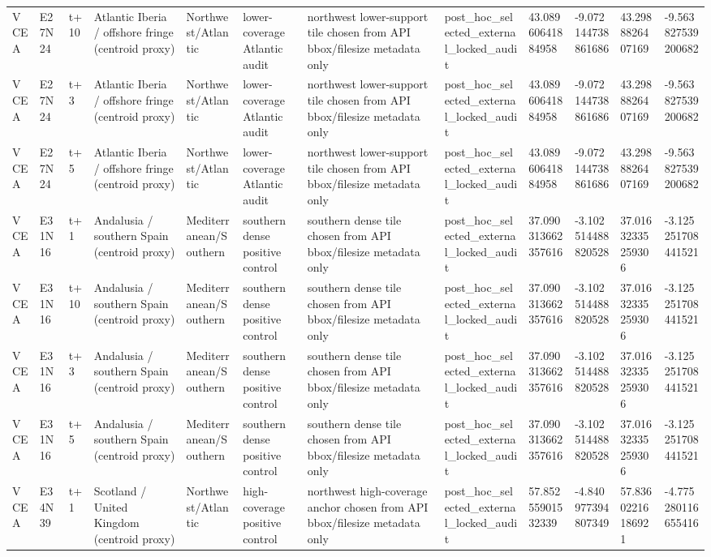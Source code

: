\begin{landscape}
\begin{longtable}{llllllllllll}
VCEA & E27N24 & t+10 & Atlantic Iberia / offshore fringe (centroid proxy) & Northwest/Atlantic & lower-coverage Atlantic audit & northwest lower-support tile chosen from API bbox/filesize metadata only & post\_hoc\_selected\_external\_locked\_audit & 43.08960641884958 & -9.072144738861686 & 43.2988826407169 & -9.563827539200682 \\
VCEA & E27N24 & t+3 & Atlantic Iberia / offshore fringe (centroid proxy) & Northwest/Atlantic & lower-coverage Atlantic audit & northwest lower-support tile chosen from API bbox/filesize metadata only & post\_hoc\_selected\_external\_locked\_audit & 43.08960641884958 & -9.072144738861686 & 43.2988826407169 & -9.563827539200682 \\
VCEA & E27N24 & t+5 & Atlantic Iberia / offshore fringe (centroid proxy) & Northwest/Atlantic & lower-coverage Atlantic audit & northwest lower-support tile chosen from API bbox/filesize metadata only & post\_hoc\_selected\_external\_locked\_audit & 43.08960641884958 & -9.072144738861686 & 43.2988826407169 & -9.563827539200682 \\
VCEA & E31N16 & t+1 & Andalusia / southern Spain (centroid proxy) & Mediterranean/Southern & southern dense positive control & southern dense tile chosen from API bbox/filesize metadata only & post\_hoc\_selected\_external\_locked\_audit & 37.090313662357616 & -3.102514488820528 & 37.01632335259306 & -3.125251708441521 \\
VCEA & E31N16 & t+10 & Andalusia / southern Spain (centroid proxy) & Mediterranean/Southern & southern dense positive control & southern dense tile chosen from API bbox/filesize metadata only & post\_hoc\_selected\_external\_locked\_audit & 37.090313662357616 & -3.102514488820528 & 37.01632335259306 & -3.125251708441521 \\
VCEA & E31N16 & t+3 & Andalusia / southern Spain (centroid proxy) & Mediterranean/Southern & southern dense positive control & southern dense tile chosen from API bbox/filesize metadata only & post\_hoc\_selected\_external\_locked\_audit & 37.090313662357616 & -3.102514488820528 & 37.01632335259306 & -3.125251708441521 \\
VCEA & E31N16 & t+5 & Andalusia / southern Spain (centroid proxy) & Mediterranean/Southern & southern dense positive control & southern dense tile chosen from API bbox/filesize metadata only & post\_hoc\_selected\_external\_locked\_audit & 37.090313662357616 & -3.102514488820528 & 37.01632335259306 & -3.125251708441521 \\
VCEA & E34N39 & t+1 & Scotland / United Kingdom (centroid proxy) & Northwest/Atlantic & high-coverage positive control & northwest high-coverage anchor chosen from API bbox/filesize metadata only & post\_hoc\_selected\_external\_locked\_audit & 57.85255901532339 & -4.840977394807349 & 57.83602216186921 & -4.775280116655416 \\

\end{longtable}
\end{landscape}
